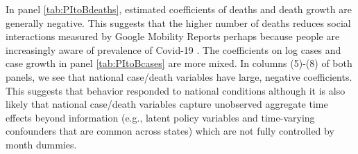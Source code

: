 \documentclass[11pt,reqno,letter]{amsart}
\theoremstyle{definition}
\begin{document}
In panel \ref{tab:PItoBdeaths}, estimated coefficients of deaths and
death growth are generally negative. This suggests that the higher
number of deaths reduces social interactions measured by Google
Mobility Reports perhaps because people are increasingly aware of
prevalence of Covid-19 \citep{maloney2020}.  The coefficients on log
cases and case growth in panel \ref{tab:PItoBcases} are more mixed. In
columns (5)-(8) of both panels, we see that national case/death
variables have large, negative coefficients. This suggests that behavior responded to national conditions although it is also likely that national case/death variables capture unobserved aggregate time effects beyond information (e.g., latent policy variables and time-varying confounders that are common across states) which are not fully controlled by month dummies.




\end{document}
